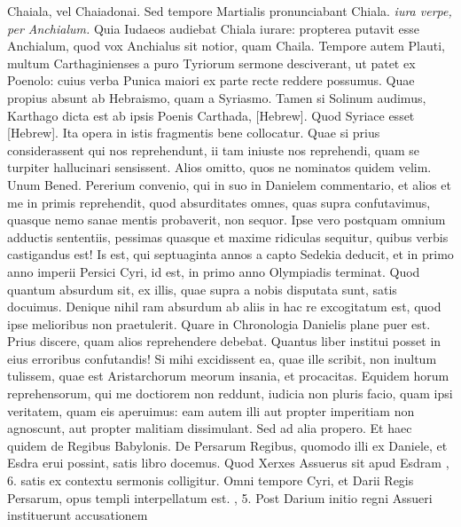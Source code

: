 Chaiala,
vel Chaiadonai.
Sed tempore Martialis pronunciabant Chiala.
\textit{iura verpe, per Anchialum.}
Quia Iudaeos audiebat Chiala iurare:
propterea putavit esse Anchialum, quod vox Anchialus sit notior,
quam Chaila.
Tempore autem Plauti, multum Carthaginienses
a puro Tyriorum sermone desciverant, ut patet ex Poenolo:
cuius verba Punica maiori ex parte recte reddere possumus.
Quae propius absunt ab Hebraismo, quam a Syriasmo.
Tamen
si Solinum audimus, Karthago dicta est ab ipsis Poenis Carthada,
\texthebrew{}[Hebrew].
Quod Syriace esset \texthebrew{}[Hebrew].
Ita opera in istis fragmentis
bene collocatur.
Quae si prius considerassent qui nos reprehendunt,
ii tam iniuste nos reprehendi, quam se turpiter hallucinari
sensissent.
Alios omitto, quos ne nominatos quidem velim.
Unum Bened.
Pererium convenio, qui in suo in Danielem commentario,
et alios et me in primis reprehendit, quod absurditates
omnes, quas supra confutavimus, quasque nemo sanae mentis
probaverit, non sequor.
Ipse vero postquam omnium adductis sententiis,
pessimas quasque et maxime ridiculas sequitur, quibus verbis
castigandus est!
Is est, qui septuaginta annos a capto Sedekia
deducit, et in primo anno imperii Persici Cyri, id est, in primo
anno Olympiadis  terminat.
Quod quantum absurdum sit, ex
illis, quae supra a nobis disputata sunt, satis docuimus.
Denique
nihil ram absurdum ab aliis in hac re excogitatum est, quod ipse
melioribus non praetulerit.
Quare in Chronologia Danielis plane
puer est.
Prius discere, quam alios reprehendere debebat.
Quantus liber institui posset in eius erroribus confutandis!
Si mihi excidissent
ea, quae ille scribit, non inultum tulissem, quae est Aristarchorum
meorum insania, et procacitas.
Equidem horum reprehensorum,
qui me doctiorem non reddunt, iudicia non pluris
facio, quam ipsi veritatem, quam eis aperuimus: eam autem illi aut
propter imperitiam non agnoscunt, aut propter malitiam dissimulant.
Sed ad alia propero.
Et haec quidem de Regibus Babylonis.
%
De Persarum Regibus, quomodo illi ex Daniele,
 et Esdra erui possint,
satis libro  docemus.
Quod Xerxes Assuerus sit apud Esdram
, 6. satis ex contextu sermonis colligitur.
Omni tempore
Cyri, et Darii Regis Persarum, opus templi interpellatum est.
, 5.
Post Darium initio regni Assueri instituerunt accusationem
